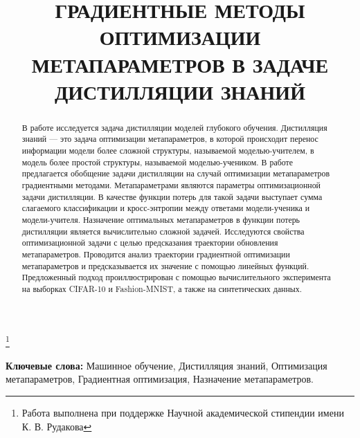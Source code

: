 \documentclass[12pt]{a&t}
\begin{document}

\title{ГРАДИЕНТНЫЕ МЕТОДЫ ОПТИМИЗАЦИИ МЕТАПАРАМЕТРОВ В ЗАДАЧЕ ДИСТИЛЛЯЦИИ ЗНАНИЙ}

\thanks{Работа выполнена при поддержке Научной академической стипендии имени К. В. Рудакова}


\maketitle

\begin{abstract}
В работе исследуется задача дистилляции моделей глубокого обучения. Дистилляция знаний --- это задача оптимизации метапараметров, в которой происходит перенос информации модели более сложной структуры, называемой моделью-учителем, в модель более простой структуры, называемой моделью-учеником. В работе предлагается обобщение задачи дистилляции на случай оптимизации метапараметров градиентными методами. Метапараметрами являются параметры оптимизационной задачи дистилляции. В качестве функции потерь для такой задачи выступает сумма слагаемого классификации и кросс-энтропии между ответами модели-ученика и модели-учителя. Назначение оптимальных метапараметров в функции потерь дистилляции является вычислительно сложной задачей. Исследуются свойства оптимизационной задачи с целью предсказания траектории обновления метапараметров. Проводится анализ траектории градиентной оптимизации метапараметров и предсказывается их значение с помощью линейных функций. Предложенный подход проиллюстрирован с помощью вычислительного эксперимента на выборках CIFAR-10 и Fashion-MNIST, а также на синтетических данных. 
\end{abstract}

\textbf{Ключевые слова:} Машинное обучение,  Дистилляция знаний, Оптимизация метапараметров, Градиентная оптимизация, Назначение метапараметров.
\end{document}
